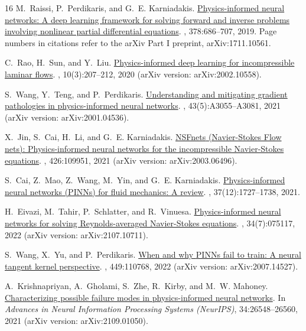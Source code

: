 \documentclass[11pt,a4paper]{article}
\begin{document}
\begin{thebibliography}{16}
M.~Raissi, P.~Perdikaris, and G.~E. Karniadakis.
\newblock \href{https://arxiv.org/pdf/1711.10561.pdf#page=6}{Physics-informed neural networks: A deep learning framework for solving forward and inverse problems involving nonlinear partial differential equations}.
, 378:686--707, 2019. Page numbers in citations refer to the arXiv Part I preprint, arXiv:1711.10561. 

C.~Rao, H.~Sun, and Y.~Liu.
\newblock \href{https://arxiv.org/pdf/2002.10558.pdf#page=2}{Physics-informed deep learning for incompressible laminar flows}.
, 10(3):207--212, 2020 (arXiv version: arXiv:2002.10558). 

S.~Wang, Y.~Teng, and P.~Perdikaris.
\newblock \href{https://arxiv.org/pdf/2001.04536.pdf#page=10}{Understanding and mitigating gradient pathologies in physics-informed neural networks}.
, 43(5):A3055--A3081, 2021 (arXiv version: arXiv:2001.04536). 

X.~Jin, S.~Cai, H.~Li, and G.~E. Karniadakis.
\newblock \href{https://arxiv.org/pdf/2003.06496.pdf#page=1}{{NSFnets} (Navier-Stokes Flow nets): Physics-informed neural networks for the incompressible Navier-Stokes equations}.
, 426:109951, 2021 (arXiv version: arXiv:2003.06496). 

S.~Cai, Z.~Mao, Z.~Wang, M.~Yin, and G.~E. Karniadakis.
\newblock \href{https://arxiv.org/pdf/2105.09506.pdf#page=1}{Physics-informed neural networks (PINNs) for fluid mechanics: A review}.
, 37(12):1727--1738, 2021. 

H.~Eivazi, M.~Tahir, P.~Schlatter, and R.~Vinuesa.
\newblock \href{https://arxiv.org/pdf/2107.10711.pdf#page=1}{Physics-informed neural networks for solving Reynolds-averaged Navier-Stokes equations}.
, 34(7):075117, 2022 (arXiv version: arXiv:2107.10711). 

S.~Wang, X.~Yu, and P.~Perdikaris.
\newblock \href{https://arxiv.org/pdf/2007.14527.pdf#page=1}{When and why {PINNs} fail to train: A neural tangent kernel perspective}.
, 449:110768, 2022 (arXiv version: arXiv:2007.14527). 

A.~Krishnapriyan, A.~Gholami, S.~Zhe, R.~Kirby, and M.~W. Mahoney.
\newblock \href{https://arxiv.org/pdf/2109.01050.pdf#page=1}{Characterizing possible failure modes in physics-informed neural networks}.
\newblock In {\em Advances in Neural Information Processing Systems (NeurIPS)}, 34:26548--26560, 2021 (arXiv version: arXiv:2109.01050). 


\end{thebibliography}
\end{document}
